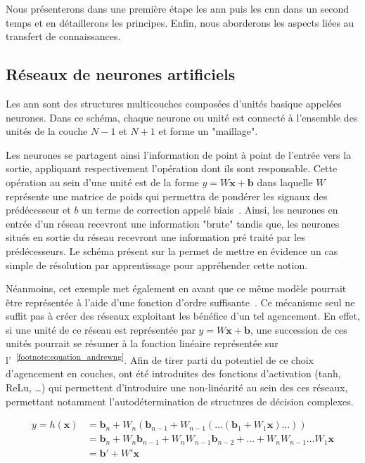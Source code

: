 Nous présenterons dans une première étape les \gls{ann} puis les \gls{cnn} dans un second temps et en détaillerons les principes. Enfin, nous aborderons les aspects liées au transfert de connaissances.\par

\subsection{Réseaux de neurones artificiels}
Les \gls{ann} sont des structures multicouches composées d'unités basique appelées neurones. Dans ce schéma, chaque neurone ou unité est connecté à l'ensemble des unités de la couche $N-1$ et $N+1$ et forme un "maillage".\par

Les neurones se partagent ainsi l'information de point à point de l'entrée vers la sortie, appliquant respectivement l'opération dont ils sont responsable. Cette opération  au sein d'une unité est de la forme $y = W\mathbf{x}+\mathbf{b}$ dans laquelle $W$ représente une matrice de poids qui permettra de pondérer les signaux des prédécesseur et $b$ un terme de correction appelé biais~\cite{Stephen1990}. Ainsi, les neurones en entrée d'un réseau recevront une information "brute" tandis que, les neurones situés en sortie du réseau recevront une information pré traité par les prédécesseurs. Le schéma présent sur la  permet de mettre en évidence un cas simple de résolution par apprentissage pour appréhender cette notion.\par

Néanmoins, cet exemple met également en avant que ce même modèle pourrait être représentée à l'aide d'une fonction d'ordre suffisante~\cite{Bishop2006}. Ce mécanisme seul ne suffit pas à créer des réseaux exploitant les bénéfice d'un tel agencement. En effet, si une unité de ce réseau est représentée par $y = W\mathbf{x}+\mathbf{b}$, une succession de ces unités pourrait se résumer à la fonction linéaire représentée sur l'~\textsuperscript{\ref{footnote:equation_andrewng}}. 
Afin de tirer parti du potentiel de ce choix d'agencement en couches, ont été introduites des fonctions d'activation (tanh, ReLu, \ldots) qui permettent d'introduire une non-linéarité au sein des ces réseaux, permettant notamment l’autodétermination de structures de décision complexes.\par

\begin{equation} 
    \label{eq:proof_linearity}
    \begin{split}
        y = h(\mathbf{x})   &=\mathbf{b}_n+W_n(\mathbf{b}_{n-1}+W_{n-1}(\dots (\mathbf{b}_1+W_1 \mathbf{x})\dots))\\
                            &=\mathbf{b}_n+W_n\mathbf{b}_{n-1}+W_nW_{n-1}\mathbf{b}_{n-2}+\dots+W_nW_{n-1}\dots W_1\mathbf{x}\\
                            &=\mathbf{b}'+W'\mathbf{x}
    \end{split}
\end{equation}
\par

